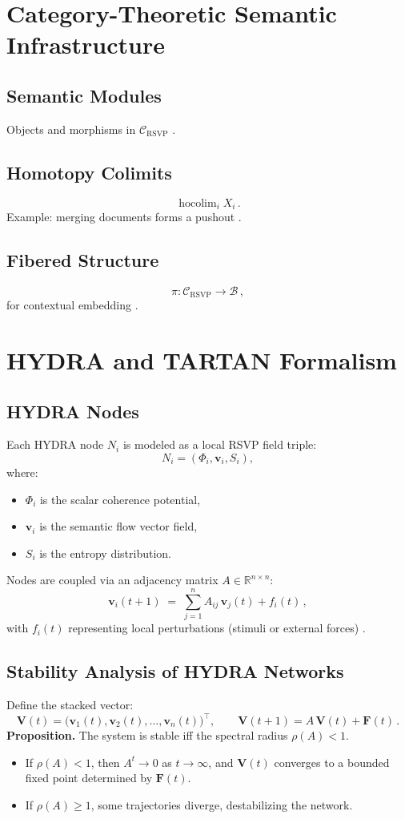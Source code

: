 \documentclass[12pt]{article}
\begin{document}
\section{Category-Theoretic Semantic Infrastructure}
\subsection*{Semantic Modules}
Objects and morphisms in \(\mathcal{C}_{\text{RSVP}}\) \citep{maclane1998}.

\subsection*{Homotopy Colimits}
\[
\operatorname{hocolim}_i X_i \, .
\]
Example: merging documents forms a pushout \citep{hatcher2002, may1999}.

\subsection*{Fibered Structure}
\[
\pi: \mathcal{C}_{\text{RSVP}} \to \mathcal{B} \, ,
\]
for contextual embedding \citep{lawvere2009}.

\section{HYDRA and TARTAN Formalism}
\subsection*{HYDRA Nodes}
Each HYDRA node \(N_i\) is modeled as a local RSVP field triple:
\[
N_i = (\Phi_i, \mathbf{v}_i, S_i),
\]
where:
\begin{itemize}
  \item \(\Phi_i\) is the scalar coherence potential,
  \item \(\mathbf{v}_i\) is the semantic flow vector field,
  \item \(S_i\) is the entropy distribution.
\end{itemize}
Nodes are coupled via an adjacency matrix \(A \in \mathbb{R}^{n \times n}\):
\[
\mathbf{v}_i(t+1) \;=\; \sum_{j=1}^n A_{ij}\,\mathbf{v}_j(t) + f_i(t) \, ,
\]
with \(f_i(t)\) representing local perturbations (stimuli or external forces) \citep{bird1988}.

\subsection*{Stability Analysis of HYDRA Networks}
Define the stacked vector:
\[
\mathbf{V}(t) = \big(\mathbf{v}_1(t), \mathbf{v}_2(t), \dots, \mathbf{v}_n(t)\big)^{\!\top}, 
\qquad \mathbf{V}(t+1) = A\,\mathbf{V}(t) + \mathbf{F}(t) \, .
\]
\textbf{Proposition.} The system is stable iff the spectral radius \(\rho(A) < 1\).
\begin{itemize}
  \item If \(\rho(A)<1\), then \(A^t \to 0\) as \(t\to\infty\), and \(\mathbf{V}(t)\) converges to a bounded fixed point determined by \(\mathbf{F}(t)\).
  \item If \(\rho(A)\ge 1\), some trajectories diverge, destabilizing the network.
\end{itemize}
\end{document}

